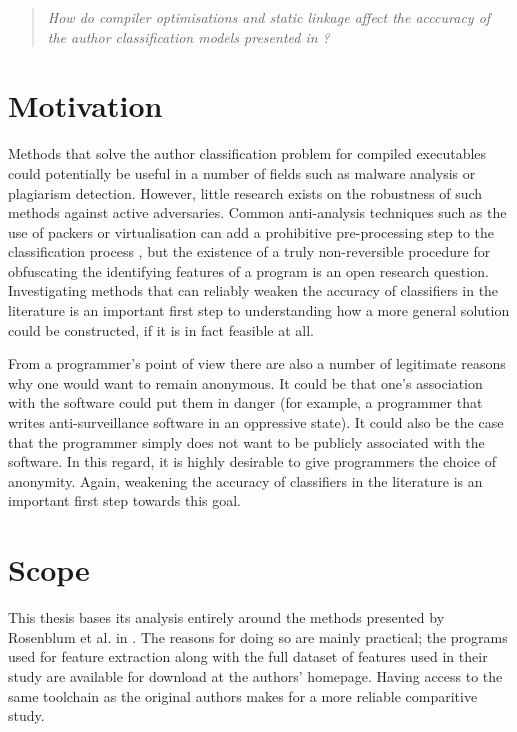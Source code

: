\documentclass[a4paper,11pt]{kth-mag}
\newenvironment{italicquotes}
{\begin{quote}\itshape}
{\end{quote}}
\begin{document}
\begin{italicquotes}
How do compiler optimisations and static linkage affect the acccuracy of the
author classification models presented in \parencite{rosenblum2011wrote}?
\end{italicquotes}

\section{Motivation}
Methods that solve the author classification problem for compiled executables
could potentially be useful in a number of fields such as malware analysis or
plagiarism detection. However, little research exists on the robustness of such
methods against active adversaries. Common anti-analysis techniques such as the
use of packers or virtualisation can add a prohibitive pre-processing step to
the classification process \parencite{caliskan2015coding}, but the existence of
a truly non-reversible procedure for obfuscating the identifying features of a
program is an open research question. Investigating methods that can reliably
weaken the accuracy of classifiers in the literature is an important first
step to understanding how a more general solution could be constructed, if it
is in fact feasible at all.

From a programmer's point of view there are also a number of legitimate reasons
why one would want to remain anonymous. It could be that one's association with
the software could put them in danger (for example, a programmer that writes
anti-surveillance software in an oppressive state). It could also be the case
that the programmer simply does not want to be publicly associated with the
software. In this regard, it is highly desirable to give programmers the choice
of anonymity. Again, weakening the accuracy of classifiers in the literature is
an important first step towards this goal.

\section{Scope}
\label{sec:scope}
This thesis bases its analysis entirely around the methods presented by
Rosenblum et al. in \parencite{rosenblum2011wrote}. The reasons for doing so
are mainly practical; the programs used for feature extraction along with the
full dataset of features used in their study are available for download at the
authors' homepage. Having access to the same toolchain as the original authors
makes for a more reliable comparitive study.
\end{document}

